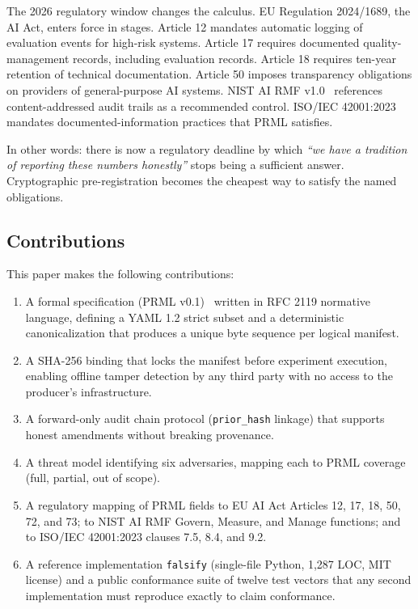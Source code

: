 \documentclass[11pt, a4paper]{article}
\begin{document}
The 2026 regulatory window changes the calculus. EU Regulation 2024/1689, the AI Act, enters force in stages. Article 12 mandates automatic logging of evaluation events for high-risk systems. Article 17 requires documented quality-management records, including evaluation records. Article 18 requires ten-year retention of technical documentation. Article 50 imposes transparency obligations on providers of general-purpose AI systems. NIST AI RMF v1.0~\cite{nist2023airmf} references content-addressed audit trails as a recommended control. ISO/IEC 42001:2023~\cite{iso420012023} mandates documented-information practices that PRML satisfies.

In other words: there is now a regulatory deadline by which \emph{``we have a tradition of reporting these numbers honestly''} stops being a sufficient answer. Cryptographic pre-registration becomes the cheapest way to satisfy the named obligations.

\subsection{Contributions}

This paper makes the following contributions:

\begin{enumerate}[leftmargin=2em, itemsep=0.3em]
  \item A formal specification (PRML v0.1)~\cite{prml2026spec} written in RFC 2119 normative language, defining a YAML 1.2 strict subset and a deterministic canonicalization that produces a unique byte sequence per logical manifest.
  \item A SHA-256 binding that locks the manifest before experiment execution, enabling offline tamper detection by any third party with no access to the producer's infrastructure.
  \item A forward-only audit chain protocol (\texttt{prior\_hash} linkage) that supports honest amendments without breaking provenance.
  \item A threat model identifying six adversaries, mapping each to PRML coverage (full, partial, out of scope).
  \item A regulatory mapping of PRML fields to EU AI Act Articles 12, 17, 18, 50, 72, and 73; to NIST AI RMF Govern, Measure, and Manage functions; and to ISO/IEC 42001:2023 clauses 7.5, 8.4, and 9.2.
  \item A reference implementation \texttt{falsify} (single-file Python, 1{,}287 LOC, MIT license) and a public conformance suite of twelve test vectors that any second implementation must reproduce exactly to claim conformance.
\end{enumerate}
\end{document}
